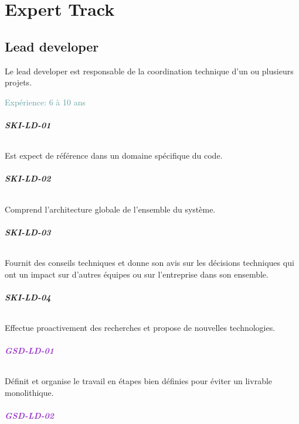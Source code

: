 \documentclass[a4paper, french, openany, 12pt]{book}
\newcommand\dex[1]{\textcolor{BrickRed}{\textbf{\uppercase{ski-{#1}}}}}
\newcommand\str[1]{\textcolor{DarkOrchid}{\textbf{\uppercase{gsd-{#1}}}}}
\newcommand\xp[1]{\textcolor{CadetBlue}{Expérience: {#1} ans}}
\begin{document}
\part{Expert Track}

\chapter{Lead developer}

Le lead developer est responsable de la coordination technique d'un ou plusieurs projets.

\xp{6 à 10}

\begin{multicols}{2}

  \paragraph*{\dex{ld-01}}

  Est expect de référence dans un domaine spécifique du code.

  \paragraph*{\dex{ld-02}}

  Comprend l'architecture globale de l'ensemble du système.

  \paragraph*{\dex{ld-03}}

  Fournit des conseils techniques et donne son avis sur les décisions techniques qui ont un impact sur d'autres équipes ou
  sur l'entreprise dans son ensemble. 

  \paragraph*{\dex{ld-04}}

  Effectue proactivement des recherches et propose de nouvelles technologies.

  \paragraph*{\str{ld-01}}

  Définit et organise le travail en étapes bien définies pour éviter un livrable monolithique.

  \paragraph*{\str{ld-02}}


\end{multicols}
\end{document}
